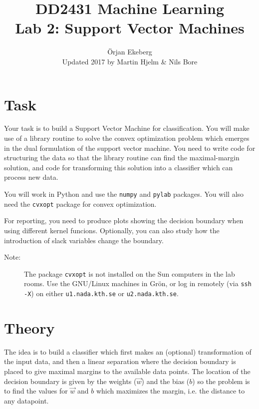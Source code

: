 \documentclass{article}
\begin{document}
\lstset{language=Python,frame=single}

\title{DD2431 Machine Learning\\Lab 2: Support Vector Machines}
\author{\"Orjan Ekeberg \\ Updated 2017 by Martin Hjelm \& Nils Bore}

\maketitle

\section{Task}

Your task is to build a Support Vector Machine for classification.  You
will make use of a library routine to solve the convex optimization
problem which emerges in the dual formulation of the support vector
machine.  You need to write code for structuring the data so that the
library routine can find the maximal-margin solution, and code for
transforming this solution into a classifier which can process new
data.

You will work in Python and use the \texttt{numpy} and \texttt{pylab}
packages.  You will also need the \texttt{cvxopt} package for convex
optimization.

For reporting, you need to produce plots showing the decision boundary
when using different kernel funcions.  Optionally, you can also study
how the introduction of slack variables change the boundary.

\begin{description}
\item[Note:] The package \texttt{cvxopt} is not installed on the Sun
  computers in the lab rooms.  Use the GNU/Linux machines in Gr\"on,
  or log in remotely (via \texttt{ssh -X}) on either
  \texttt{u1.nada.kth.se} or \texttt{u2.nada.kth.se}.
\end{description}


\section{Theory}

The idea is to build a classifier which first makes an (optional)
transformation of the input data, and then a linear separation where
the decision boundary is placed to give maximal margins to the
available data points.  The location of the decision boundary is given
by the weights (\(\vec{w}\)) and the bias (\(b\)) so the problem is to
find the values for \(\vec{w}\) and \(b\) which maximizes the margin,
i.e. the distance to any datapoint.
\end{document}
